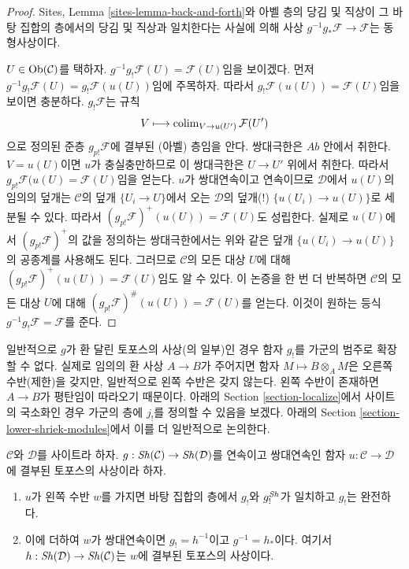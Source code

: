 \begin{proof}
Sites, Lemma \ref{sites-lemma-back-and-forth}와 아벨 층의 당김 및 직상이
그 바탕 집합의 층에서의 당김 및 직상과 일치한다는 사실에 의해
사상 $g^{-1}g_*\mathcal{F} \to \mathcal{F}$는 동형사상이다.

\medskip\noindent
$U \in \mathop{\mathrm{Ob}}\nolimits(\mathcal{C})$를 택하자.
$g^{-1}g_!\mathcal{F}(U) = \mathcal{F}(U)$임을 보이겠다. 먼저
$g^{-1}g_!\mathcal{F}(U) = g_!\mathcal{F}(u(U))$임에 주목하자.
따라서 $g_!\mathcal{F}(u(U)) = \mathcal{F}(U)$임을 보이면 충분하다.
$g_!\mathcal{F}$는 규칙
$$
V \longmapsto \mathop{\mathrm{colim}}\nolimits_{V \to u(U')} \mathcal{F}(U')
$$
으로 정의된 준층 $g_{p!}\mathcal{F}$에 결부된 (아벨) 층임을 안다.
쌍대극한은 $\textit{Ab}$ 안에서 취한다. $V = u(U)$이면 $u$가
충실충만하므로 이 쌍대극한은 $U \to U'$ 위에서 취한다. 따라서
$g_{p!}\mathcal{F}(u(U) = \mathcal{F}(U)$임을 얻는다.
$u$가 쌍대연속이고 연속이므로 $\mathcal{D}$에서 $u(U)$의 임의의
덮개는 $\mathcal{C}$의 덮개 $\{U_i \to U\}$에서 오는 $\mathcal{D}$의
덮개(!) $\{u(U_i) \to u(U)\}$로 세분될 수 있다. 따라서
$(g_{p!}\mathcal{F})^+(u(U)) = \mathcal{F}(U)$도 성립한다. 실제로
$u(U)$에서 $(g_{p!}\mathcal{F})^+$의 값을 정의하는 쌍대극한에서는 위와
같은 덮개 $\{u(U_i) \to u(U)\}$의 공종계를 사용해도 된다. 그러므로
$\mathcal{C}$의 모든 대상 $U$에 대해
$(g_{p!}\mathcal{F})^+(u(U)) = \mathcal{F}(U)$임도 알 수 있다.
이 논증을 한 번 더 반복하면 $\mathcal{C}$의 모든 대상 $U$에 대해
$(g_{p!}\mathcal{F})^\#(u(U)) = \mathcal{F}(U)$를 얻는다. 이것이 원하는
등식 $g^{-1}g_!\mathcal{F} = \mathcal{F}$를 준다.
\end{proof}

\begin{remark}
\label{remark-no-extension}
일반적으로 $g$가 환 달린 토포스의 사상(의 일부)인 경우 함자 $g_!$를
가군의 범주로 확장할 수 없다. 실제로 임의의 환 사상 $A \to B$가
주어지면 함자 $M \mapsto B \otimes_A M$은 오른쪽 수반(제한)을 갖지만,
일반적으로 왼쪽 수반은 갖지 않는다. 왼쪽 수반이 존재하면
$A \to B$가 평탄임이 따라오기 때문이다. 아래의 Section
\ref{section-localize}에서 사이트의 국소화인 경우 가군의 층에 $j_!$를
정의할 수 있음을 보겠다. 아래의 Section
\ref{section-lower-shriek-modules}에서 이를 더 일반적으로 논의한다.
\end{remark}

\begin{lemma}
\label{lemma-have-left-adjoint}
$\mathcal{C}$와 $\mathcal{D}$를 사이트라 하자.
$g : \mathop{\mathit{Sh}}\nolimits(\mathcal{C}) \to \mathop{\mathit{Sh}}\nolimits(\mathcal{D})$를 연속이고 쌍대연속인 함자
$u : \mathcal{C} \to \mathcal{D}$에 결부된 토포스의 사상이라 하자.
\begin{enumerate}
\item $u$가 왼쪽 수반 $w$를 가지면 바탕 집합의 층에서 $g_!$와
$g_!^{\mathop{\mathit{Sh}}\nolimits}$가 일치하고 $g_!$는 완전하다.
\item 이에 더하여 $w$가 쌍대연속이면 $g_! = h^{-1}$이고
$g^{-1} = h_*$이다. 여기서
$h : \mathop{\mathit{Sh}}\nolimits(\mathcal{D}) \to \mathop{\mathit{Sh}}\nolimits(\mathcal{C})$는 $w$에 결부된 토포스의
사상이다.
\end{enumerate}
\end{lemma}

